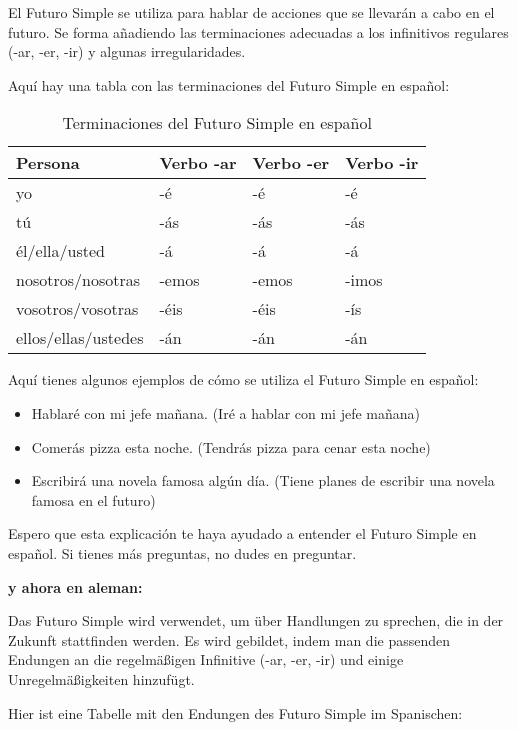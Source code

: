 \documentclass{article}
\begin{document}
El Futuro Simple se utiliza para hablar de acciones que se llevarán a cabo en
el futuro. Se forma añadiendo las terminaciones adecuadas a los infinitivos
regulares (-ar, -er, -ir) y algunas irregularidades.

Aquí hay una tabla con las terminaciones del Futuro Simple en español:

\begin{table}[h!]
\centering
\begin{tabular}{@{}llll@{}}
\toprule
Persona & Verbo -ar & Verbo -er & Verbo -ir \\
\midrule
yo & -é & -é & -é \\
tú & -ás & -ás & -ás \\
él/ella/usted & -á & -á & -á \\
nosotros/nosotras & -emos & -emos & -imos \\
vosotros/vosotras & -éis & -éis & -ís \\
ellos/ellas/ustedes & -án & -án & -án \\
\bottomrule
\end{tabular}
\caption{Terminaciones del Futuro Simple en español}
\label{tabla:terminaciones}
\end{table}

Aquí tienes algunos ejemplos de cómo se utiliza el Futuro Simple en español:

\begin{itemize}
\item Hablaré con mi jefe mañana. (Iré a hablar con mi jefe mañana)
\item Comerás pizza esta noche. (Tendrás pizza para cenar esta noche)
\item Escribirá una novela famosa algún día. (Tiene planes de escribir una
  novela famosa en el futuro)
\end{itemize}

Espero que esta explicación te haya ayudado a entender el Futuro Simple en
español. Si tienes más preguntas, no dudes en preguntar.

\vspace{15pt}
\textbf{y ahora en aleman:}
\vspace{15pt}

Das Futuro Simple wird verwendet, um über Handlungen zu sprechen, die in der
Zukunft stattfinden werden. Es wird gebildet, indem man die passenden Endungen
an die regelmäßigen Infinitive (-ar, -er, -ir) und einige Unregelmäßigkeiten
hinzufügt.

Hier ist eine Tabelle mit den Endungen des Futuro Simple im Spanischen:
\end{document}
